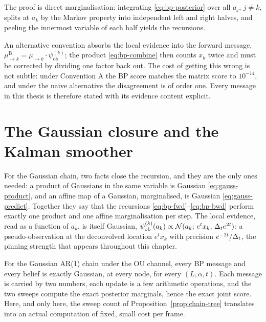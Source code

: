 The proof is direct marginalisation: integrating \eqref{eq:bp-posterior}
over all $a_j$, $j \neq k$, splits at $a_k$ by the Markov property into
independent left and right halves, and peeling the innermost variable of
each half yields the recursions.

\begin{remark}\label{rmk:bp-trap}
An alternative convention absorbs the local evidence into the forward
message, $\mu^{\mathrm{B}}_{\to k} = \mu_{\to k} \cdot
\psi^{(k)}_{\mathrm{ob}}$; the product \eqref{eq:bp-combine} then counts
$x_k$ twice and must be corrected by dividing one factor back out. The cost
of getting this wrong is not subtle: under
Convention A the BP score matches the matrix score to $10^{-14}$, and under the
naive alternative the disagreement is of order one. Every message in this thesis
is therefore stated with its evidence content explicit.
\end{remark}

\section{The Gaussian closure and the Kalman smoother}
\label{sec:bp-gaussian}\label{sec:bp-kalman}

For the Gaussian chain, two facts close the recursion, and they are the only
ones needed: a product of Gaussians in the same variable is Gaussian
\eqref{eq:gauss-product}, and an affine map of a Gaussian, marginalised, is
Gaussian \eqref{eq:gauss-predict}. Together they say that the recursions
\eqref{eq:bp-fwd}--\eqref{eq:bp-bwd} perform exactly one product and one
affine marginalisation per step. The local evidence, read as a function
of $a_k$, is itself Gaussian,
$\psi^{(k)}_{\mathrm{ob}}(a_k) \propto
\mathcal{N}(a_k;\, e^{t} x_k,\, \Delta_t e^{2t})$: a pseudo-observation at the
deconvolved location $e^t x_k$ with precision $e^{-2t}/\Delta_t$, the
pinning strength that appears throughout this chapter.

\begin{theorem}\label{thm:bp-closure}
For the Gaussian AR(1) chain under the OU channel, every BP message and
every belief is exactly Gaussian, at every node, for every
$(L, \alpha, t)$. Each message is carried by two numbers, each update
is a few arithmetic operations, and the two sweeps compute the exact
posterior marginals, hence the exact joint score. Here, and only here,
the sweep count of Proposition~\ref{prop:chain-tree} translates into an
actual computation of fixed, small cost per frame.
\end{theorem}

